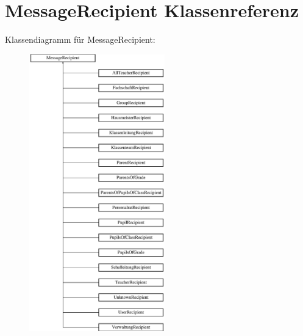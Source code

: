 \hypertarget{class_message_recipient}{}\section{Message\+Recipient Klassenreferenz}
\label{class_message_recipient}
Klassendiagramm für Message\+Recipient\+:\begin{figure}[H]
\begin{center}
\leavevmode
\includegraphics[height=12.000000cm]{class_message_recipient}
\end{center}
\end{figure}
